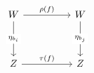 \[\begin{tikzcd}
	W && W \\
	\\
	Z && Z
	\arrow["{\rho(f)}", from=1-1, to=1-3]
	\arrow["{\eta_{b_{j}}}"{description}, from=1-3, to=3-3]
	\arrow["{\tau(f)}", from=3-1, to=3-3]
	\arrow["{\eta_{b_{i}}}"{description}, from=1-1, to=3-1]
\end{tikzcd}\]